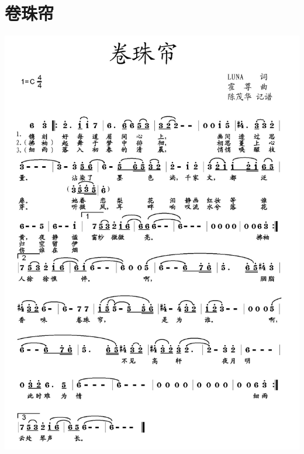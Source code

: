 \documentclass[cn,pad,chinese,chinesefont=nofont]{elegantbook}
\begin{document}
\section{卷珠帘}
    \includegraphics[width=\textwidth]{dongxiao/202003231629卷珠帘.jpg}
\end{document}
